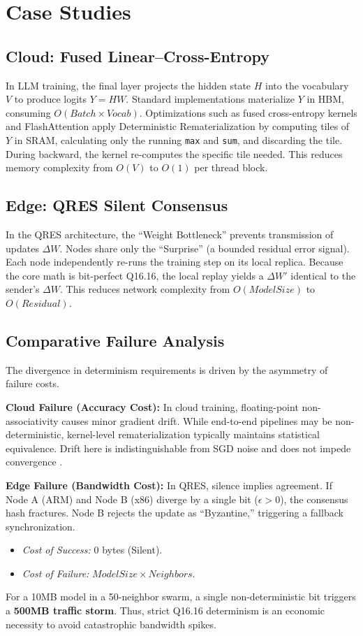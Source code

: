 \documentclass[conference]{IEEEtran}
\begin{document}
\section{Case Studies}

\subsection{Cloud: Fused Linear--Cross-Entropy}
In LLM training, the final layer projects the hidden state $H$ into the vocabulary $V$ to produce logits $Y = HW$. Standard implementations materialize $Y$ in HBM, consuming $O(Batch \times Vocab)$. Optimizations such as fused cross-entropy kernels \cite{narang2021efficient} and FlashAttention \cite{dao2022flashattention} apply Deterministic Rematerialization by computing tiles of $Y$ in SRAM, calculating only the running \texttt{max} and \texttt{sum}, and discarding the tile. During backward, the kernel re-computes the specific tile needed. This reduces memory complexity from $O(V)$ to $O(1)$ per thread block.

\subsection{Edge: QRES Silent Consensus}
In the QRES architecture, the ``Weight Bottleneck'' prevents transmission of updates $\Delta W$. Nodes share only the ``Surprise'' (a bounded residual error signal). Each node independently re-runs the training step on its local replica. Because the core math is bit-perfect Q16.16, the local replay yields a $\Delta W'$ identical to the sender's $\Delta W$. This reduces network complexity from $O(ModelSize)$ to $O(Residual)$.

\subsection{Comparative Failure Analysis}
The divergence in determinism requirements is driven by the asymmetry of failure costs.

\textbf{Cloud Failure (Accuracy Cost):} In cloud training, floating-point non-associativity causes minor gradient drift. While end-to-end pipelines may be non-deterministic, kernel-level rematerialization typically maintains statistical equivalence. Drift here is indistinguishable from SGD noise and does not impede convergence \cite{jain2019reproducibility}.

\textbf{Edge Failure (Bandwidth Cost):} In QRES, silence implies agreement. If Node A (ARM) and Node B (x86) diverge by a single bit ($\epsilon > 0$), the consensus hash fractures. Node B rejects the update as ``Byzantine,'' triggering a fallback synchronization.
\begin{itemize}
    \item \textit{Cost of Success:} 0 bytes (Silent).
    \item \textit{Cost of Failure:} $ModelSize \times Neighbors$.
\end{itemize}
For a 10MB model in a 50-neighbor swarm, a single non-deterministic bit triggers a \textbf{500MB traffic storm}. Thus, strict Q16.16 determinism is an economic necessity to avoid catastrophic bandwidth spikes.
\end{document}
